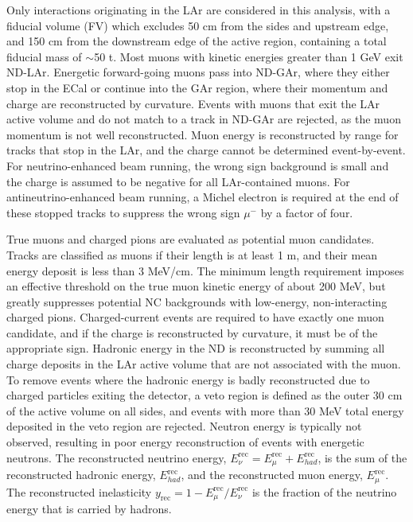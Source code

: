 Only interactions originating in the LAr are considered in this analysis, with a fiducial volume (FV) which excludes 50 cm from the sides and upstream edge, and 150 cm from the downstream edge of the active region, containing a total fiducial mass of $\sim$50 t. Most muons with kinetic energies greater than 1 GeV exit ND-LAr. Energetic forward-going muons pass into ND-GAr, where they either stop in the ECal or continue into the GAr region, where their momentum and charge are reconstructed by curvature. Events with muons that exit the LAr active volume and do not match to a track in ND-GAr are rejected, as the muon momentum is not well reconstructed. Muon energy is reconstructed by range for tracks that stop in the LAr, and the charge cannot be determined event-by-event. For neutrino-enhanced beam running, the wrong sign background is small and the charge is assumed to be negative for all LAr-contained muons. For antineutrino-enhanced beam running, a Michel electron is required at the end of these stopped tracks to suppress the wrong sign $\mu^-$ by a factor of four.

True muons and charged pions are evaluated as potential muon candidates. Tracks are classified as muons if their length is at least 1 m, and their mean energy deposit is less than 3 MeV/cm. The minimum length requirement imposes an effective threshold on the true muon kinetic energy of about 200 MeV, but greatly suppresses potential NC backgrounds with low-energy, non-interacting charged pions. Charged-current events are required to have exactly one muon candidate, and if the charge is reconstructed by curvature, it must be of the appropriate sign. Hadronic energy in the ND is reconstructed by summing all charge deposits in the LAr active volume that are not associated with the muon. To remove events where the hadronic energy is badly reconstructed due to charged particles exiting the detector, a veto region is defined as the outer 30 cm of the active volume on all sides, and events with more than 30 MeV total energy deposited in the veto region are rejected. Neutron energy is typically not observed, resulting in poor energy reconstruction of events with energetic neutrons. The reconstructed neutrino energy, $E_{\nu}^{\mathrm{rec}} = E_{\mu}^{\mathrm{rec}} + E_{had}^{\mathrm{rec}}$, is the sum of the reconstructed hadronic energy, $E_{had}^{\mathrm{rec}}$, and the reconstructed muon energy, $E_{\mu}^{\mathrm{rec}}$. The reconstructed inelasticity $y_{\mathrm{rec}} = 1 - E_{\mu}^{\mathrm{rec}}/E_{\nu}^{\mathrm{rec}}$ is the fraction of the neutrino energy that is carried by hadrons.

